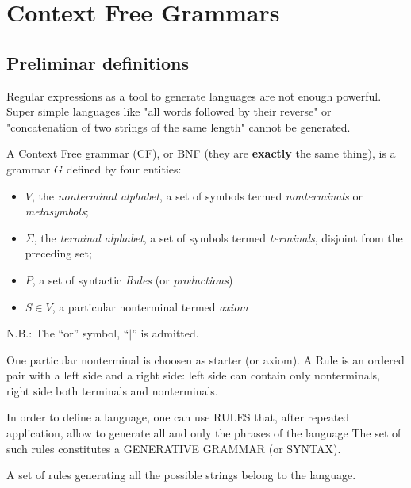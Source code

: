 \chapter{Context Free Grammars}%
	\section{Preliminar definitions}
		Regular expressions as a tool to generate languages are not enough powerful. 
		Super simple languages like "all words followed by their reverse" or "concatenation of two strings of the same length" cannot be generated.

		\begin{definition}
			A Context Free grammar (CF), or BNF (they are \textbf{exactly} the same thing), is a grammar $G$ defined by four entities:
			\begin{itemize}
				\item $V$, the \emph{nonterminal alphabet}, a set of symbols termed \emph{nonterminals} or \emph{metasymbols};
				\item $\Sigma$, the \emph{terminal alphabet}, a set of symbols termed \emph{terminals}, disjoint from the preceding set;
				\item $P$, a set of syntactic \emph{Rules} (or \emph{productions})
				\item $S\in V$, a particular nonterminal termed \emph{axiom}
			\end{itemize}
			N.B.: The ``or'' symbol, ``$\vert$'' is admitted.%
		\end{definition}
		One particular nonterminal is choosen as starter (or axiom).
		A Rule is an ordered pair with a left side and a right side: left side can contain only nonterminals, right side both terminals and nonterminals. 
		
		In order to define a language, one can use RULES that, after repeated application, allow to generate all and only the phrases of the language
		The set of such rules constitutes a GENERATIVE GRAMMAR (or SYNTAX).

		\begin{definition}
			A set of rules generating all the possible strings belong to the language.
		\end{definition}


